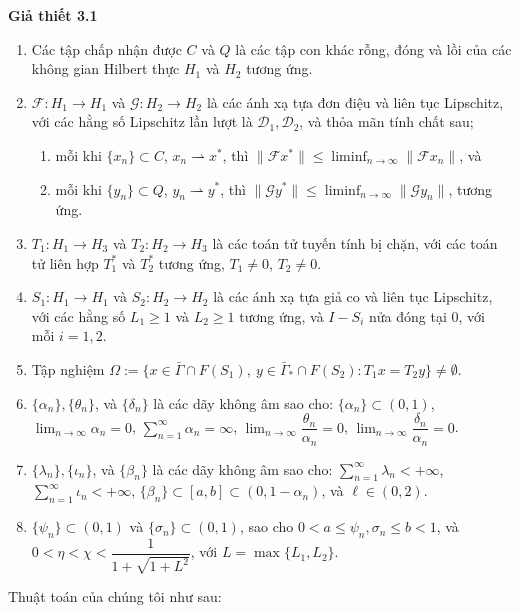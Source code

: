 \documentclass{MyBook}
\theoremstyle{plain}
\theoremstyle{definition}
\theoremstyle{remark}
\numberwithin{equation}{chapter}
\newcommand{\Fc}{\mathcal{F}}
\newcommand{\Gc}{\mathcal{G}}
\newcommand{\Dc}{\mathcal{D}}
\newcommand{\nm}[1]{\lVert #1\rVert}
\newcommand{\wto}{\rightharpoonup}
\newcommand{\Gam}{\bar{\Gamma}}
\newcommand{\Gams}{\bar{\Gamma}_{*}}
\newcommand{\Fix}[1]{F(#1)}
\begin{document}
\medskip
\noindent\textbf{Giả thiết 3.1}\label{asm:3.1}
\begin{enumerate}[label=(A\arabic*),leftmargin=*]
\item Các tập chấp nhận được $C$ và $Q$ là các tập con khác rỗng, đóng và lồi của các không gian Hilbert thực $H_1$ và $H_2$ tương ứng.
\item $\Fc:H_1\to H_1$ và $\Gc:H_2\to H_2$ là các ánh xạ tựa đơn điệu và liên tục Lipschitz, với các hằng số Lipschitz lần lượt là $\Dc_1,\Dc_2$, và thỏa mãn tính chất sau;
\begin{enumerate}[label=(\roman*)]
\item mỗi khi $\{x_n\}\subset C$, $x_n\wto x^{*}$, thì $\nm{\Fc x^{*}}\le\liminf_{n\to\infty}\nm{\Fc x_n}$, và
\item mỗi khi $\{y_n\}\subset Q$, $y_n\wto y^{*}$, thì $\nm{\Gc y^{*}}\le\liminf_{n\to\infty}\nm{\Gc y_n}$, tương ứng.
\end{enumerate}
\item $T_1:H_1\to H_3$ và $T_2:H_2\to H_3$ là các toán tử tuyến tính bị chặn, với các toán tử liên hợp $T_1^{*}$ và $T_2^{*}$ tương ứng, $T_1\ne 0$, $T_2\ne 0$.
\item $S_1:H_1\to H_1$ và $S_2:H_2\to H_2$ là các ánh xạ tựa giả co và liên tục Lipschitz, với các hằng số $L_1\ge 1$ và $L_2\ge 1$ tương ứng, và $I-S_i$ nửa đóng tại $0$, với mỗi $i=1,2$.
\item Tập nghiệm $\Omega:=\{x\in\Gam\cap \Fix{S_1},\ y\in\Gams\cap \Fix{S_2}:T_1x=T_2y\}\ne\emptyset$.
\item $\{\alpha_n\},\{\theta_n\}$, và $\{\delta_n\}$ là các dãy không âm sao cho: $\{\alpha_n\}\subset(0,1)$, $\lim_{n\to\infty}\alpha_n=0$, $\sum_{n=1}^{\infty}\alpha_n=\infty$, $\lim_{n\to\infty}\dfrac{\theta_n}{\alpha_n}=0$, $\lim_{n\to\infty}\dfrac{\delta_n}{\alpha_n}=0$.
\item $\{\lambda_n\},\{\iota_n\}$, và $\{\beta_n\}$ là các dãy không âm sao cho: $\sum_{n=1}^{\infty}\lambda_n<+\infty$, $\sum_{n=1}^{\infty}\iota_n<+\infty$, $\{\beta_n\}\subset[a,b]\subset(0,1-\alpha_n)$, và $\ell\in(0,2)$.
\item $\{\psi_n\}\subset(0,1)$ và $\{\sigma_n\}\subset(0,1)$, sao cho $0<a\le\psi_n,\sigma_n\le b<1$, và $0<\eta<\chi<\dfrac{1}{1+\sqrt{1+L^2}}$, với $L=\max\{L_1,L_2\}$.
\end{enumerate}

Thuật toán của chúng tôi như sau:
\end{document}
